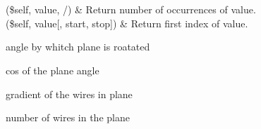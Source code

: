 \documentclass[letterpaper,10pt,english]{sphinxmanual}
\begin{document}
\begin{fulllineitems}
\begin{savenotes}\sphinxatlongtablestart\begin{longtable}{}
\hline

\endfirsthead

%
{}\\
\hline

\endhead

\hline
{}\\
\endfoot

\endlastfoot

(\$self, value, /)
&
Return number of occurrences of value.
\\
\hline
{}(\$self, value{[}, start, stop{]})
&
Return first index of value.
\\
\hline
\end{longtable}\sphinxatlongtableend\end{savenotes}

\begin{fulllineitems}
\label{\detokenize{dataTypes:dataTypes.PlaneInfo.angle}}
angle by whitch plane is roatated

\end{fulllineitems}


\begin{fulllineitems}
\label{\detokenize{dataTypes:dataTypes.PlaneInfo.cos}}
cos of the plane angle

\end{fulllineitems}


\begin{fulllineitems}
\label{\detokenize{dataTypes:dataTypes.PlaneInfo.gradient}}
gradient of the wires in plane

\end{fulllineitems}


\begin{fulllineitems}
\label{\detokenize{dataTypes:dataTypes.PlaneInfo.noOfWires}}
number of wires in the plane


\end{fulllineitems}
\end{fulllineitems}
\end{document}
